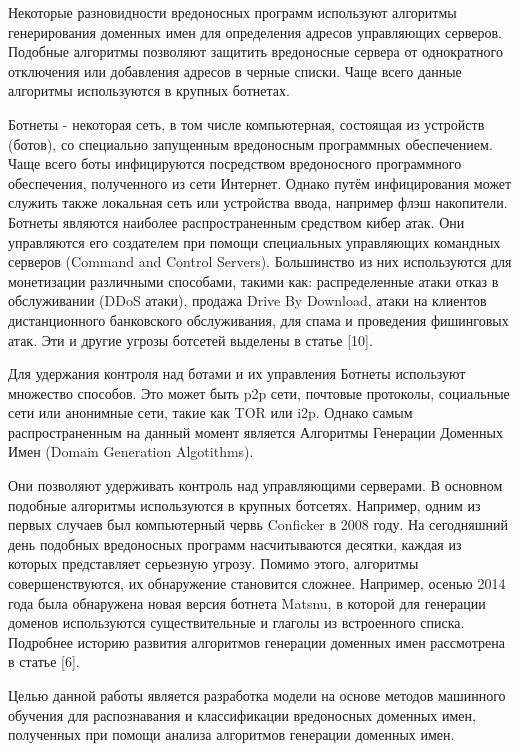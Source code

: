 
Некоторые разновидности вредоносных программ используют алгоритмы генерирования доменных имен для определения адресов управляющих серверов. Подобные алгоритмы позволяют защитить вредоносные сервера от однократного отключения или добавления адресов в черные списки. Чаще всего данные алгоритмы используются в крупных ботнетах.

Ботнеты - некоторая сеть, в том числе компьютерная, состоящая из устройств (ботов), со специально запущенным вредоносным программных обеспечением. Чаще всего боты инфицируются посредством вредоносного программного обеспечения, полученного из сети Интернет. Однако путём инфицирования может служить также локальная сеть или устройства ввода, например флэш накопители. Ботнеты являются наиболее распространенным средством кибер атак. Они управляются его создателем при помощи специальных управляющих командных серверов (Command and Control Servers). Большинство из них используются для монетизации различными способами, такими как: распределенные атаки отказ в обслуживании (DDoS атаки), продажа Drive By Download, атаки на клиентов дистанционного банковского обслуживания, для спама и проведения фишинговых атак. Эти и другие угрозы ботсетей выделены в статье [10].

Для удержания контроля над ботами и их управления Ботнеты используют множество способов. Это может быть p2p сети, почтовые протоколы, социальные сети или анонимные сети, такие как TOR или i2p.
Однако самым распространенным на данный момент является Алгоритмы Генерации Доменных Имен (Domain Generation Algotithms).

Они позволяют удерживать контроль над управляющими серверами. В основном подобные алгоритмы используются в крупных ботсетях. Например, одним из первых случаев был компьютерный червь Conficker в 2008 году. На сегодняшний день подобных вредоносных программ насчитываются десятки, каждая из которых представляет серьезную угрозу. Помимо этого, алгоритмы совершенствуются, их обнаружение становится сложнее. Например, осенью 2014 года была обнаружена новая версия ботнета Matsnu, в которой для генерации доменов используются существительные и глаголы из встроенного списка. Подробнее историю развития алгоритмов генерации доменных имен рассмотрена в статье [6].

Целью данной работы является разработка модели на основе методов машинного обучения для распознавания и классификации вредоносных доменных имен, полученных при помощи анализа алгоритмов генерации доменных имен.

